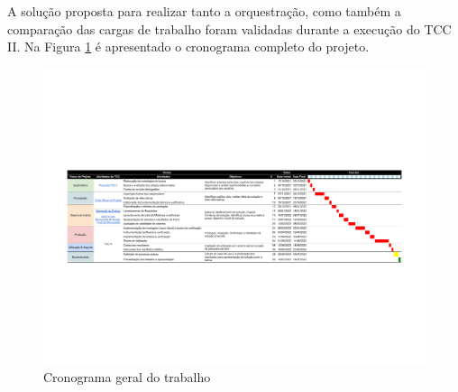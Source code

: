 A solução proposta para realizar tanto a orquestração, como também a comparação das cargas de trabalho foram validadas durante a execução do TCC II.
Na Figura \ref{fig:cronograma} é apresentado o cronograma completo do projeto.

\begin{landscape}
    \begin{figure}[!ht]
        \centering
        \includegraphics[width=1\linewidth]{04-figuras/TCC cronograma - Sheet1.pdf}
        \caption{Cronograma geral do trabalho}
        \label{fig:cronograma}
    \end{figure}
\end{landscape}